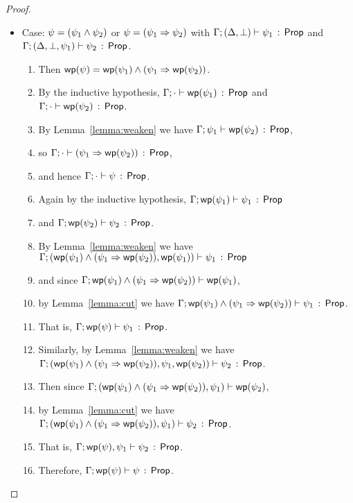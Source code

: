 \documentclass[11pt]{article}
\begin{document}
\begin{proof}
\begin{itemize}
      
  \item Case: $\psi = (\psi_1 \wedge \psi_2)$ or $\psi = (\psi_1 \Rightarrow \psi_2)$ with
       $\Gamma;(\Delta,\bot) \vdash \psi_1\, :\, \mathsf{Prop}$ and 
              $\Gamma;(\Delta,\bot,\psi_1) \vdash \psi_2\, :\, \mathsf{Prop}$.
       \begin{enumerate}
       \item Then $\mathop{\mathsf{wp}}(\psi) = \mathop{\mathsf{wp}}(\psi_1) \wedge (\psi_1 \Rightarrow \mathop{\mathsf{wp}}(\psi_2))$.
       \item By the inductive hypothesis,
         $\Gamma;\cdot \vdash \mathop{\mathsf{wp}}(\psi_1)\, :\, \mathsf{Prop}$
         and $\Gamma;\cdot \vdash \mathop{\mathsf{wp}}(\psi_2)\, :\, \mathsf{Prop}$.
       \item 
       		By Lemma~\ref{lemma:weaken} we have 
			$\Gamma;\psi_1 \vdash \mathop{\mathsf{wp}}(\psi_2)\, :\, \mathsf{Prop}$,
		\item
			so $\Gamma;\cdot \vdash (\psi_1 \Rightarrow \mathop{\mathsf{wp}}(\psi_2))\, :\, \mathsf{Prop}$,
		\item
		 	and hence $\Gamma;\cdot \vdash \psi\, :\, \mathsf{Prop}$.
	    \item
	        Again by the inductive hypothesis,
	        $\Gamma;\mathop{\mathsf{wp}}(\psi_1) \vdash \psi_1\, :\, \mathsf{Prop}$
	    \item
	        and $\Gamma;\mathop{\mathsf{wp}}(\psi_2) \vdash \psi_2\, :\, \mathsf{Prop}$.
	    \item
	        By Lemma~\ref{lemma:weaken} we have
	        $\Gamma;(\mathop{\mathsf{wp}}(\psi_1) \wedge (\psi_1 \Rightarrow \mathop{\mathsf{wp}}(\psi_2)),\mathop{\mathsf{wp}}(\psi_1)) \vdash \psi_1\, :\, \mathsf{Prop}$
	    \item
	        and since
	        $\Gamma;\mathop{\mathsf{wp}}(\psi_1) \wedge (\psi_1 \Rightarrow \mathop{\mathsf{wp}}(\psi_2)) \vdash \mathop{\mathsf{wp}}(\psi_1)$,
	    \item
	        by Lemma~\ref{lemma:cut} we have
	        	$\Gamma;\mathop{\mathsf{wp}}(\psi_1) \wedge (\psi_1 \Rightarrow \mathop{\mathsf{wp}}(\psi_2)) \vdash \psi_1\, :\, \mathsf{Prop}$.
	    \item
	        That is, $\Gamma;\mathop{\mathsf{wp}}(\psi) \vdash \psi_1\, :\, \mathsf{Prop}$.
	    \item
	        Similarly, by Lemma~\ref{lemma:weaken} we have
	        $\Gamma;(\mathop{\mathsf{wp}}(\psi_1) \wedge (\psi_1 \Rightarrow \mathop{\mathsf{wp}}(\psi_2)),\psi_1,\mathop{\mathsf{wp}}(\psi_2)) \vdash \psi_2\, :\, \mathsf{Prop}$.
	    \item 
	        Then since
	        $\Gamma;(\mathop{\mathsf{wp}}(\psi_1) \wedge (\psi_1 \Rightarrow \mathop{\mathsf{wp}}(\psi_2)),\psi_1) \vdash \mathop{\mathsf{wp}}(\psi_2)$,
	    \item
	        by Lemma~\ref{lemma:cut} we have
	        $\Gamma;(\mathop{\mathsf{wp}}(\psi_1) \wedge (\psi_1 \Rightarrow \mathop{\mathsf{wp}}(\psi_2)),\psi_1) \vdash \psi_2\, :\, \mathsf{Prop}$.
	    \item
	        That is,
	        $\Gamma;\mathop{\mathsf{wp}}(\psi),\psi_1 \vdash \psi_2\, :\, \mathsf{Prop}$.
	    \item
	        Therefore,
	        $\Gamma;\mathop{\mathsf{wp}}(\psi) \vdash \psi\, :\, \mathsf{Prop}$.    
       \end{enumerate}
  \end{itemize}
\end{proof}
\end{document}
